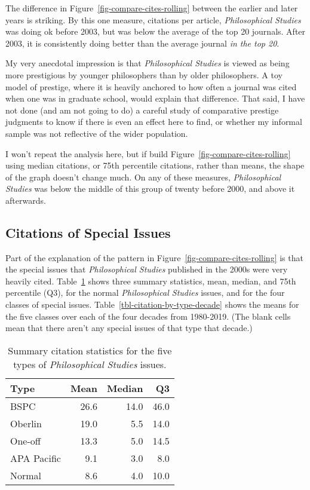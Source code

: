 \documentclass[
  11pt,
  letterpaper,
  DIV=11,
  numbers=noendperiod,
  twoside]{scrartcl}
\begin{document}
The difference in Figure~\ref{fig-compare-cites-rolling} between the
earlier and later years is striking. By this one measure, citations per
article, \emph{Philosophical Studies} was doing ok before 2003, but was
below the average of the top 20 journals. After 2003, it is consistently
doing better than the average journal \emph{in the top 20}.

My very anecdotal impression is that \emph{Philosophical Studies} is
viewed as being more prestigious by younger philosophers than by older
philosophers. A toy model of prestige, where it is heavily anchored to
how often a journal was cited when one was in graduate school, would
explain that difference. That said, I have not done (and am not going to
do) a careful study of comparative prestige judgments to know if there
is even an effect here to find, or whether my informal sample was not
reflective of the wider population.

I won't repeat the analysis here, but if build
Figure~\ref{fig-compare-cites-rolling} using median citations, or 75th
percentile citations, rather than means, the shape of the graph doesn't
change much. On any of these measures, \emph{Philosophical Studies} was
below the middle of this group of twenty before 2000, and above it
afterwards.

\subsection{Citations of Special
Issues}\label{sec-citations-of-special-issues}

Part of the explanation of the pattern in
Figure~\ref{fig-compare-cites-rolling} is that the special issues that
\emph{Philosophical Studies} published in the 2000s were very heavily
cited. Table~\ref{tbl-citation-by-type} shows three summary statistics,
mean, median, and 75th percentile (Q3), for the normal
\emph{Philosophical Studies} issues, and for the four classes of special
issues. Table~\ref{tbl-citation-by-type-decade} shows the means for the
five classes over each of the four decades from 1980-2019. (The blank
cells mean that there aren't any special issues of that type that
decade.)

\begin{longtable}[]{@{}lrrr@{}}

\caption{\label{tbl-citation-by-type}Summary citation statistics for the
five types of \emph{Philosophical Studies} issues.}

\tabularnewline

\toprule\noalign{}
Type & Mean & Median & Q3 \\
\midrule\noalign{}
\endhead
\bottomrule\noalign{}
\endlastfoot
BSPC & 26.6 & 14.0 & 46.0 \\
Oberlin & 19.0 & 5.5 & 14.0 \\
One-off & 13.3 & 5.0 & 14.5 \\
APA Pacific & 9.1 & 3.0 & 8.0 \\
Normal & 8.6 & 4.0 & 10.0 \\

\end{longtable}
\end{document}
